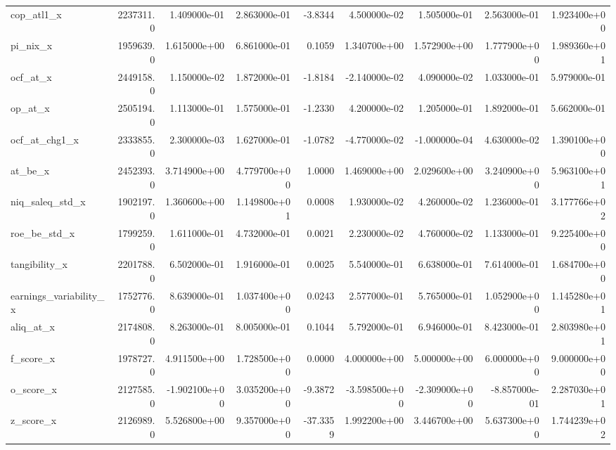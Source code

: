 \documentclass[12pt]{article}
\begin{document}
\begin{landscape}
\begin{longtable}{|l|r|r|r|r|r|r|r|r|}
cop\_atl1\_x              &  2237311.0 &  1.409000e-01 &  2.863000e-01 &     -3.8344 &  4.500000e-02 &  1.505000e-01 &  2.563000e-01 &  1.923400e+00 \\
pi\_nix\_x                &  1959639.0 &  1.615000e+00 &  6.861000e-01 &      0.1059 &  1.340700e+00 &  1.572900e+00 &  1.777900e+00 &  1.989360e+01 \\
ocf\_at\_x                &  2449158.0 &  1.150000e-02 &  1.872000e-01 &     -1.8184 & -2.140000e-02 &  4.090000e-02 &  1.033000e-01 &  5.979000e-01 \\
op\_at\_x                 &  2505194.0 &  1.113000e-01 &  1.575000e-01 &     -1.2330 &  4.200000e-02 &  1.205000e-01 &  1.892000e-01 &  5.662000e-01 \\
ocf\_at\_chg1\_x           &  2333855.0 &  2.300000e-03 &  1.627000e-01 &     -1.0782 & -4.770000e-02 & -1.000000e-04 &  4.630000e-02 &  1.390100e+00 \\
at\_be\_x                 &  2452393.0 &  3.714900e+00 &  4.779700e+00 &      1.0000 &  1.469000e+00 &  2.029600e+00 &  3.240900e+00 &  5.963100e+01 \\
niq\_saleq\_std\_x         &  1902197.0 &  1.360600e+00 &  1.149800e+01 &      0.0008 &  1.930000e-02 &  4.260000e-02 &  1.236000e-01 &  3.177766e+02 \\
roe\_be\_std\_x            &  1799259.0 &  1.611000e-01 &  4.732000e-01 &      0.0021 &  2.230000e-02 &  4.760000e-02 &  1.133000e-01 &  9.225400e+00 \\
tangibility\_x           &  2201788.0 &  6.502000e-01 &  1.916000e-01 &      0.0025 &  5.540000e-01 &  6.638000e-01 &  7.614000e-01 &  1.684700e+00 \\
earnings\_variability\_x  &  1752776.0 &  8.639000e-01 &  1.037400e+00 &      0.0243 &  2.577000e-01 &  5.765000e-01 &  1.052900e+00 &  1.145280e+01 \\
aliq\_at\_x               &  2174808.0 &  8.263000e-01 &  8.005000e-01 &      0.1044 &  5.792000e-01 &  6.946000e-01 &  8.423000e-01 &  2.803980e+01 \\
f\_score\_x               &  1978727.0 &  4.911500e+00 &  1.728500e+00 &      0.0000 &  4.000000e+00 &  5.000000e+00 &  6.000000e+00 &  9.000000e+00 \\
o\_score\_x               &  2127585.0 & -1.902100e+00 &  3.035200e+00 &     -9.3872 & -3.598500e+00 & -2.309000e+00 & -8.857000e-01 &  2.287030e+01 \\
z\_score\_x               &  2126989.0 &  5.526800e+00 &  9.357000e+00 &    -37.3359 &  1.992200e+00 &  3.446700e+00 &  5.637300e+00 &  1.744239e+02 \\

\end{longtable}
\end{landscape}
\end{document}
